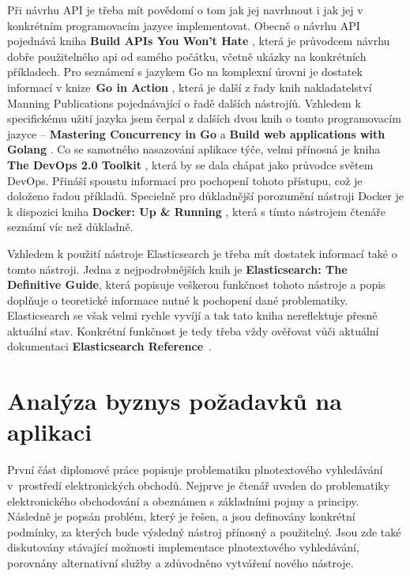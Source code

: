 \documentclass[FM,DP]{tulthesis}
\begin{document}
Při návrhu API je třeba mít povědomí o tom jak jej navrhnout i jak jej v konkrétním programovacím 
jazyce implementovat. Obecně o návrhu API pojednává kniha \textbf{Build APIs You Won't Hate} \cite{api},
která je průvodcem návrhu dobře použitelného api od samého počátku, včetně ukázky na konkrétních příkladech.
Pro seznámení s jazykem Go na komplexní úrovni je dostatek informací v knize~\textbf{Go in Action} 
\cite{go-in-action}, která je další z řady knih nakladatelství Manning Publications pojednávající
o řadě dalších nástrojíů. Vzhledem k specifickému užití jazyka jsem čerpal z dalších dvou knih
o tomto programovacím jazyce -- \textbf{Mastering Concurrency in Go} \cite{go-concurrency} a 
\textbf{Build web applications with Golang} \cite{go-xml}. Co se samotného nasazování aplikace týče, 
velmi přínosná je kniha \textbf{The DevOps 2.0 Toolkit} \cite{devops}, která by se dala chápat jako průvodce 
světem DevOps. Přináší spoustu informací pro pochopení tohoto přístupu, což je doloženo řadou 
příkladů. Specielně pro důkladnější porozumění nástroji Docker je k dispozici kniha 
\textbf{Docker: Up \& Running} \cite{docker}, která s tímto nástrojem čtenáře seznámí víc než důkladně.

Vzhledem k použití nástroje Elasticsearch je třeba mít dostatek informací také o tomto nástroji.
Jedna z nejpodrobnějších knih je \textbf{Elasticsearch: The Definitive Guide}, která
popisuje veškerou funkčnost tohoto nástroje a popis doplňuje o teoretické informace nutné
k pochopení dané problematiky. Elasticsearch se však velmi rychle vyvíjí a tak tato kniha
nereflektuje přesně aktuální stav. Konkrétní funkčnost je tedy třeba vždy ověřovat vůči
aktuální dokumentaci \textbf{Elasticsearch Reference}~\cite{elastic-reference}.


\chapter{Analýza byznys požadavků na aplikaci}

První část diplomové práce popisuje problematiku plnotextového vyhledávání 
v~prostředí elektronických obchodů. Nejprve je čtenář uveden do problematiky elektronického
obchodování a obeznámen s základními pojmy a principy. Následně je popsán problém, 
který je řešen, a jsou definovány konkrétní podmínky, za kterých bude výsledný nástroj
přínosný a použitelný. Jsou zde také diskutovány stávající možnosti implementace
plnotextového vyhledávání, porovnány alternativní služby a zdůvodněno vytváření nového nástroje.
\end{document}

